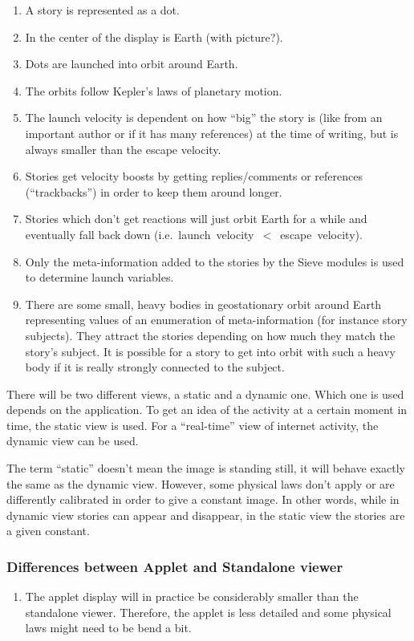 \begin{enumerate}
  \item A story is represented as a dot.
  \item In the center of the display is Earth (with picture?).
  \item Dots are launched into orbit around Earth.
  \item The orbits follow Kepler's laws of planetary motion.
  \item The launch velocity is dependent on how ``big'' the story is (like from
        an important author or if it has many references) at the time of
        writing, but is always smaller than the escape velocity.
  \item Stories get velocity boosts by getting replies/comments or
        references (``trackbacks'') in order to keep them around longer.
  \item Stories which don't get reactions will just orbit Earth for a while and
        eventually fall back down \mbox{(i.e. launch velocity $<$ escape
        velocity)}.
  \item Only the meta-information added to the stories by the Sieve modules is
        used to determine launch variables.
  \item There are some small, heavy bodies in geostationary orbit around Earth
        representing values of an enumeration of meta-information (for instance
        story subjects). They attract the stories depending on how much they
        match the story's subject. It is possible for a story to get into orbit
        with such a heavy body if it is really strongly connected to the
        subject.
\end{enumerate}

There will be two different views, a static and a dynamic one. Which one is
used depends on the application. To get an idea of the activity at a certain
moment in time, the static view is used. For a ``real-time'' view of internet
activity, the dynamic view can be used.

The term ``static'' doesn't mean the image is standing still, it will behave
exactly the same as the dynamic view. However, some physical laws don't apply
or are differently calibrated in order to give a constant image. In other
words, while in dynamic view stories can appear and disappear, in the static
view the stories are a given constant.

\subsubsection{Differences between Applet and Standalone viewer}

\begin{enumerate}
  \item The applet display will in practice be considerably smaller than the
        standalone viewer. Therefore, the applet is less detailed and some
        physical laws might need to be bend a bit.
\end{enumerate}

